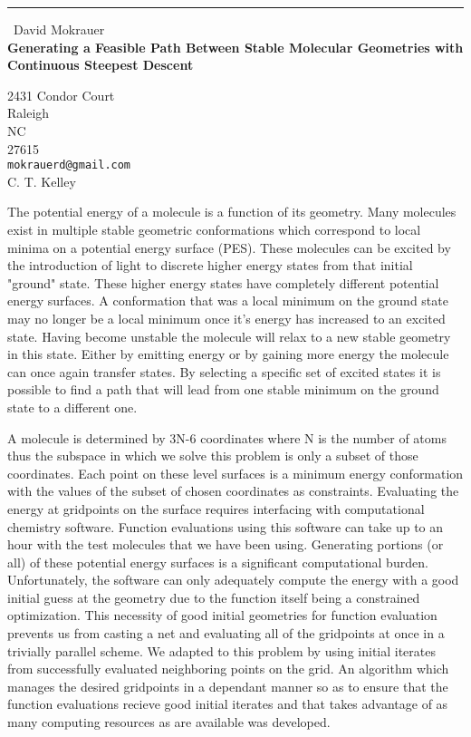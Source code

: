 \documentclass{report}
\begin{document}
\begin{center}
\rule{6in}{1pt} \
{\large David Mokrauer \\
{\bf Generating a Feasible Path Between Stable Molecular Geometries with Continuous Steepest Descent}}

2431 Condor Court \\ Raleigh \\ NC \\ 27615
\\
{\tt mokrauerd@gmail.com}\\
C. T. Kelley\end{center}

The potential energy of a molecule is a function of its geometry. Many
molecules exist in multiple stable geometric conformations which
correspond to local minima on a potential energy surface (PES). These
molecules can be excited by the introduction of light to discrete higher
energy states from that initial "ground" state. These higher energy
states have completely different potential energy surfaces. A
conformation that was a local minimum on the ground state may no longer
be a local minimum once it's energy has increased to an excited state.
Having become unstable the molecule will relax to a new stable geometry
in this state. Either by emitting energy or by gaining more energy the
molecule can once again transfer states. By selecting a specific set of
excited states it is possible to find a path that will lead from one
stable minimum on the ground state to a different one.

A molecule is determined by 3N-6 coordinates where N is the number of
atoms thus the subspace in which we solve this problem is only a subset
of those coordinates. Each point on these level surfaces is a minimum
energy conformation with the values of the subset of chosen coordinates
as constraints. Evaluating the energy at gridpoints on the surface
requires interfacing with computational chemistry software. Function
evaluations using this software can take up to an hour with the test
molecules that we have been using. Generating portions (or all) of these
potential energy surfaces is a significant computational burden.
Unfortunately, the software can only adequately compute the energy with a
good initial guess at the geometry due to the function itself being a
constrained optimization. This necessity of good initial geometries for
function evaluation prevents us from casting a net and evaluating all of
the gridpoints at once in a trivially parallel scheme. We adapted to this
problem by using initial iterates from successfully evaluated neighboring
points on the grid. An algorithm which manages the desired gridpoints in
a dependant manner so as to ensure that the function evaluations recieve
good initial iterates and that takes advantage of as many computing
resources as are available was developed.
\end{document}
